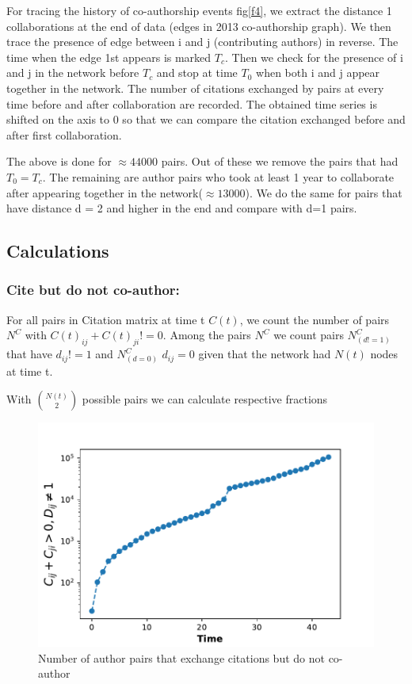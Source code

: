 \documentclass[aps, pre, twocolumn, nofootinbib]{revtex4-1}
\begin{document}
For tracing the history of co-authorship events fig\ref{f4}, we extract the distance 1 collaborations at the end of data (edges in 2013 co-authorship graph). We then trace the presence of edge between i and j (contributing authors) in reverse. The time when the edge 1st appears is marked $T_c$. Then we check for the presence of i and j in the network before $T_c$ and stop at time $T_0$ when both i and j appear together in the network. The number of citations exchanged by pairs at every time before and after collaboration are recorded. The obtained time series is shifted on the axis to 0 so that we can compare the citation exchanged before and after first collaboration.

The above is done for $\approx 44000$ pairs. Out of these we remove the pairs that had $T_0 = T_c$. The remaining are author pairs who took at least 1 year to collaborate after appearing together in the network($\approx 13000$).  We do the same for pairs that have distance d = 2 and higher in the end and compare with d=1 pairs. 

\subsection{Calculations}

\subsubsection{Cite but do not co-author:} 
For all pairs in Citation matrix at time t $C(t)$, we count the number of pairs $N^C$ with $C(t)_{ij} + C(t)_{ji} != 0$. Among the pairs $N^C$ we count pairs $N^C_{(d!=1)}$ that have $d_{ij} != 1$ and $N^C_{(d=0)}$ $d_{ij} = 0$ given that the network had $N(t)$ nodes at time t.

With $\binom{N(t)}{2}$ possible pairs we can calculate respective fractions 

\begin{figure}
	\centering
	\includegraphics[scale = 0.45]{plots/cit_dnot1}
	
	\captionsetup{singlelinecheck=false, justification=raggedright,  labelsep=space}
	\caption{Number of author pairs that exchange citations but do not co-author}
	\label{ftwo}
\end{figure}
\end{document}
